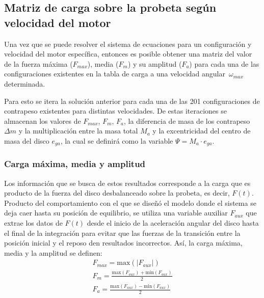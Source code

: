 \subsection{Matriz de carga sobre la probeta según velocidad del motor}
Una vez que se puede resolver el sistema de ecuaciones para un configuración y velocidad del motor específica, entonces es posible obtener una matriz del valor de la fuerza máxima ($F_{max}$), media ($F_m$) y su amplitud ($F_a$) para cada una de las configuraciones existentes en la tabla de carga a una velocidad angular $\,\omega_{max}\,$ determinada.

Para esto se itera la solución anterior para cada una de las 201 configuraciones de contrapeso existentes para distintas velocidades. De estas iteraciones se almacenan los valores de $F_{max}$, $F_m$, $F_a$, la diferencia de masa de los contrapeso $\Delta m$ y la multiplicación entre la masa total $M_a$ y la excentricidad del centro de masa del disco $e_{ga}$, la cual se definirá como la variable $\Psi=M_a \cdot e_{ga}$.

\subsubsection{Carga máxima, media y amplitud}
Los información que se busca de estos resultados corresponde a la carga que es producto de la fuerza del disco desbalanceado sobre la probeta, es decir, $F(t)$. Producto del comportamiento con el que se diseñó el modelo donde el sistema se deja caer hasta su posición de equilibrio,  se utiliza una variable auxiliar $F_{aux}$ que extrae los datos de $F(t)$ desde el inicio de la aceleración angular del disco hasta el final de la integración para evitar que las fuerzas de la transición entre la posición inicial y el reposo den resultados incorrectos. Así, la carga máxima, media y la amplitud se definen:
\begin{gather} 
	F_{max} = \text{max}(|F_{aux}|) \label{eq:f_max}\\
	F_m = \frac{\text{max}(F_{aux}) + \text{min}(F_{aux})}{2} \label{eq:f_m}\\
	F_a = \frac{\text{max}(F_{aux}) - \text{min}(F_{aux})}{2} \label{eq:f_a}
\end{gather}

